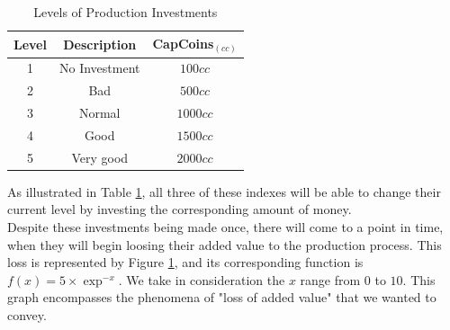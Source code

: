 \begin{table}[ht]
\centering
\begin{tabular}{c|c|c}
\hline
 Level & Description & CapCoins$_{(cc)}$\\
\hline \hline
 1 & No Investment & $100cc$ \\
 2 & Bad & $ 500cc$\\
 3 & Normal & $1000cc$ \\
 4 & Good & $1500cc$ \\
 5 & Very good & $2000cc$\\
\hline
\end{tabular}
\caption{Levels of Production Investments}
\label{table:prod-investments}
\end{table}
As illustrated in Table \ref{table:prod-investments}, all three of these indexes will be able to change their current level by investing the corresponding amount of money.\\
Despite these investments being made once, there will come to a point in time, when they will begin loosing their added value to the production process. This loss is represented by Figure \ref{fig:InvestmentGraph}, and its corresponding function is $f(x)=5\times\exp^{-x}$. We take in consideration the $x$ range from $0$ to $10$. This graph encompasses the phenomena of "loss of added value" that we wanted to convey.

\begin{figure}[ht]
\centering
{}
	\label{fig:InvestmentGraph}
\end{figure}


